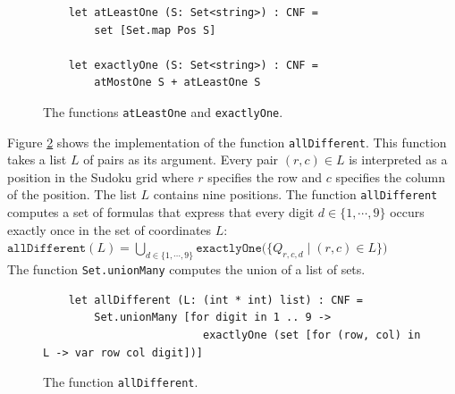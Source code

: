 \begin{figure}[!ht]
\centering
\begin{verbatim}
    let atLeastOne (S: Set<string>) : CNF =
        set [Set.map Pos S]

    let exactlyOne (S: Set<string>) : CNF =
        atMostOne S + atLeastOne S
\end{verbatim}
\vspace*{-0.3cm}
\caption{The functions \texttt{atLeastOne} and \texttt{exactlyOne}.}
\label{fig:sudoku-exactly}
\end{figure}

Figure \ref{fig:sudoku-exactlyOnce} shows the implementation of the function
\texttt{allDifferent}.  This function takes a list $L$ of pairs as its argument.  Every pair $(r,c) \in L$ is
interpreted as a position in the Sudoku grid where $r$ specifies the row and $c$ specifies the column of the
position.  The list $L$ contains nine positions.  The function \texttt{allDifferent} computes a set of formulas
that express that every digit $d \in \{1,\cdots,9\}$ occurs exactly once in the set of coordinates $L$: 
\\[0.2cm]
\hspace*{1.3cm}
$\texttt{allDifferent}(L) = \bigcup\limits_{d \in \{1,\cdots,9\}} \mathtt{exactlyOne}\bigl(\bigl\{ Q_{r,c,d} \mid (r,c) \in L \bigl\}\bigr)$
\\[0.2cm]
The function \texttt{Set.unionMany} computes the union of a list of sets.

\begin{figure}[!ht]
\centering
\begin{verbatim}
    let allDifferent (L: (int * int) list) : CNF =
        Set.unionMany [for digit in 1 .. 9 ->
                         exactlyOne (set [for (row, col) in L -> var row col digit])]
\end{verbatim}
\vspace*{-0.3cm}
\caption{The function \texttt{allDifferent}.}
\label{fig:sudoku-exactlyOnce}
\end{figure}

